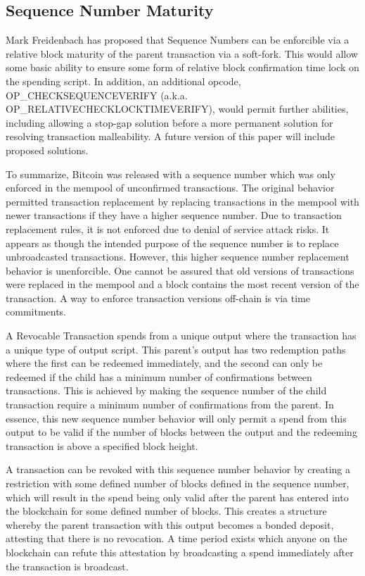 \documentclass[letterpaper,11pt]{article}
\begin{document}
\subsection{Sequence Number Maturity}

Mark Freidenbach has proposed that Sequence Numbers can be enforcible via a
relative block maturity of the parent transaction via a
soft-fork\cite{seqnum}. This would allow some basic ability to ensure some form
of relative block confirmation time lock on the spending script. In addition, an
additional opcode, OP\_CHECKSEQUENCEVERIFY\cite{csv} (a.k.a.
OP\_RELATIVECHECKLOCKTIMEVERIFY)\cite{relCLTV}, would permit further abilities,
including allowing a stop-gap solution before a more permanent solution for
resolving transaction malleability. A future version of this paper will include
proposed solutions.

To summarize, Bitcoin was released with a sequence number which was only
enforced in the mempool of unconfirmed transactions. The original behavior
permitted transaction replacement by replacing transactions in the mempool with
newer transactions if they have a higher sequence number. Due to transaction
replacement rules, it is not enforced due to denial of service attack risks. It
appears as though the intended purpose of the sequence number is to replace
unbroadcasted transactions. However, this higher sequence number replacement
behavior is unenforcible. One cannot be assured that old versions of
transactions were replaced in the mempool and a block contains the most recent
version of the transaction. A way to enforce transaction versions off-chain is
via time commitments.

A Revocable Transaction spends from a unique output where the transaction has a
unique type of output script. This parent's output has two redemption paths
where the first can be redeemed immediately, and the second can only be redeemed
if the child has a minimum number of confirmations between transactions. This is
achieved by making the sequence number of the child transaction require a
minimum number of confirmations from the parent. In essence, this new sequence
number behavior will only permit a spend from this output to be valid if the
number of blocks between the output and the redeeming transaction is above a
specified block height.

A transaction can be revoked with this sequence number behavior by creating a
restriction with some defined number of blocks defined in the sequence number,
which will result in the spend being only valid after the parent has entered
into the blockchain for some defined number of blocks. This creates a structure
whereby the parent transaction with this output becomes a bonded deposit,
attesting that there is no revocation. A time period exists which anyone on the
blockchain can refute this attestation by broadcasting a spend immediately
after the transaction is broadcast.
\end{document}
